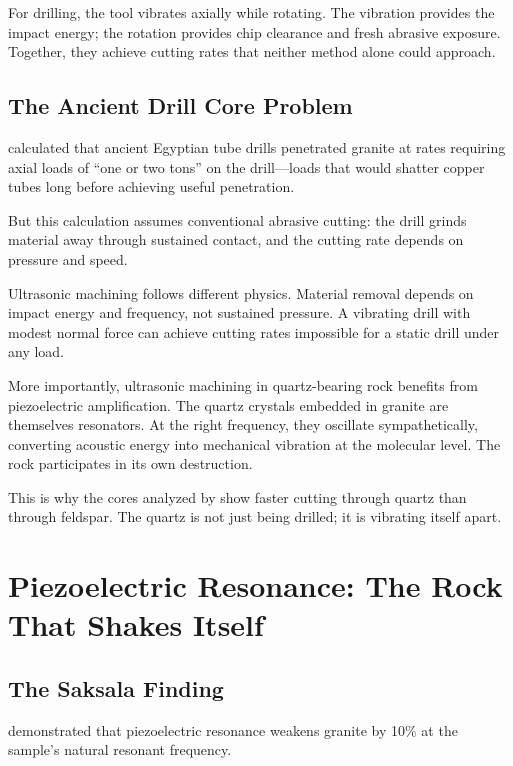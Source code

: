 \documentclass[11pt]{article}
\begin{document}
For drilling, the tool vibrates axially while rotating. The vibration provides the impact energy; the rotation provides chip clearance and fresh abrasive exposure. Together, they achieve cutting rates that neither method alone could approach.

\subsection{The Ancient Drill Core Problem}

\citet{Petrie1883} calculated that ancient Egyptian tube drills penetrated granite at rates requiring axial loads of ``one or two tons'' on the drill---loads that would shatter copper tubes long before achieving useful penetration.

But this calculation assumes conventional abrasive cutting: the drill grinds material away through sustained contact, and the cutting rate depends on pressure and speed.

Ultrasonic machining follows different physics. Material removal depends on impact energy and frequency, not sustained pressure. A vibrating drill with modest normal force can achieve cutting rates impossible for a static drill under any load.

More importantly, ultrasonic machining in quartz-bearing rock benefits from piezoelectric amplification. The quartz crystals embedded in granite are themselves resonators. At the right frequency, they oscillate sympathetically, converting acoustic energy into mechanical vibration at the molecular level. The rock participates in its own destruction.

This is why the cores analyzed by \citet{Petrie1883} show faster cutting through quartz than through feldspar. The quartz is not just being drilled; it is vibrating itself apart.

\section{Piezoelectric Resonance: The Rock That Shakes Itself}

\subsection{The Saksala Finding}

\citet{Saksala2023} demonstrated that piezoelectric resonance weakens granite by 10\% at the sample's natural resonant frequency.
\end{document}
